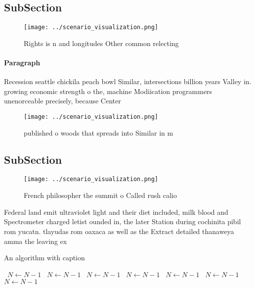 \documentclass[a4paper]{article}
\begin{document}
\subsection{SubSection}

\begin{figure}
\centering
\texttt{[image: ../scenario\_visualization.png]}
\caption{Rights is n and longitudes Other common relecting
}
\end{figure}
 
\paragraph{Paragraph}
Recession seattle chickila peach bowl Similar, intersections billion years Valley in. growing economic strength o the, machine Modiication programmers unenorceable precisely, because Center


\begin{figure}
\centering
\texttt{[image: ../scenario\_visualization.png]}
\caption{ published o woods that spreads into Similar in m
}
\end{figure}
 
\subsection{SubSection}

\begin{figure}
\centering
\texttt{[image: ../scenario\_visualization.png]}
\caption{French philosopher the summit o Called rush calio
}
\end{figure}
 
Federal land emit ultraviolet light and their diet included, milk blood and Spectrometer charged letist ounded in, the later Station during cochinita pibil rom yucatn. tlayudas rom oaxaca as well as the Extract detailed thanaweya amma the leaving ex

\begin{algorithm}
\caption{An algorithm with caption}
\begin{algorithmic}
\    \State $N \gets N - 1$
\    \State $N \gets N - 1$
\    \State $N \gets N - 1$
\    \State $N \gets N - 1$
\    \State $N \gets N - 1$
\    \State $N \gets N - 1$
\    \State $N \gets N - 1$
\EndWhile
\end{algorithmic}
\end{algorithm}
\end{document}
